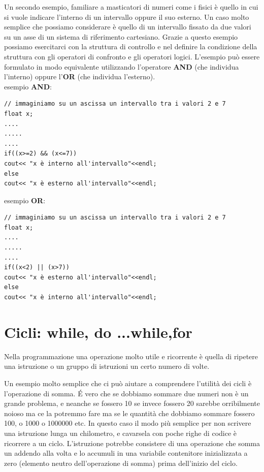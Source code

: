 \documentclass[11pt,fleqn]{book} %
\begin{document}
Un secondo esempio, familiare a masticatori di numeri come i fisici è quello in cui si vuole indicare l'interno di un intervallo oppure il suo esterno. Un caso molto semplice che possiamo considerare è quello di un intervallo fissato da due valori su un asse di un sistema di riferimento cartesiano. Grazie a questo esempio possiamo esercitarci con la struttura di controllo e nel definire la condizione della struttura con gli operatori di confronto e gli operatori logici. 
L'esempio può essere formulato in modo equivalente utilizzando l'operatore \textbf{AND} (che individua l'interno) oppure l'\textbf{OR} (che individua l'esterno).\\
esempio \textbf{AND}: 
\begin{verbatim}
// immaginiamo su un ascissa un intervallo tra i valori 2 e 7
float x;
....
.....
....
if((x>=2) && (x<=7))
cout<< "x è interno all'intervallo"<<endl;
else
cout<< "x è esterno all'intervallo"<<endl;
\end{verbatim}
 
esempio \textbf{OR}: 
\begin{verbatim}
// immaginiamo su un ascissa un intervallo tra i valori 2 e 7
float x;
....
.....
....
if((x<2) || (x>7))
cout<< "x è esterno all'intervallo"<<endl;
else
cout<< "x è interno all'intervallo"<<endl;
\end{verbatim}

\section{Cicli:  while, do ...while,for}

Nella programmazione una operazione molto utile e ricorrente è quella di ripetere una istruzione o un gruppo di istruzioni un certo numero di volte. 

Un esempio molto semplice che ci può aiutare a comprendere l'utilità dei cicli è l'operazione di somma. \'E vero che se dobbiamo sommare due numeri non è un grande problema, e neanche se fossero 10 se invece fossero 20 sarebbe orribilmente noioso ma ce la potremmo fare ma se le quantità che dobbiamo sommare fossero 100, o 1000 o 1000000 etc. In questo caso il modo più semplice per non scrivere una istruzione lunga un chilometro, e cavarsela con poche righe di codice  è ricorrere a un ciclo.
L'istruzione potrebbe consistere di una operazione che somma un addendo alla volta e lo accumuli in una variabile contenitore inizializzata a zero (elemento neutro dell'operazione di somma) prima dell'inizio del ciclo.
\end{document}
